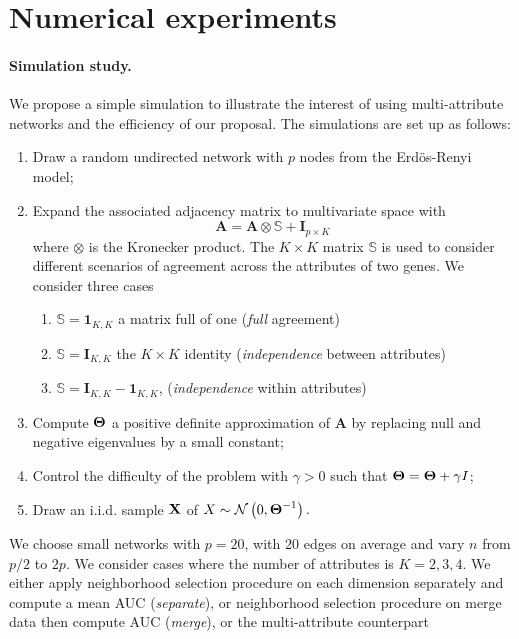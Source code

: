 \section{Numerical  experiments}

\paragraph*{Simulation study.} We propose a simple simulation to
illustrate the interest of using multi-attribute networks and the
efficiency of our proposal.  The simulations are set up as follows:
\begin{enumerate}
\item  Draw  a random  undirected  network  with  $p$ nodes  from  the
  Erdös-Renyi model;
\item  Expand the  associated adjacency  matrix to  multivariate space
  with
  $$\mathbf{A} = \mathbf{A}  \otimes \mathbb{S} + \mathbf{I}_{p\times K}$$
  where $\otimes$ is the Kronecker product. The $K\times K$ matrix
  $\mathbb{S}$ is used to consider different scenarios of agreement
  across the attributes of two genes. We consider three cases
  \begin{enumerate}
  \item $\mathbb{S} = \mathbf{1}_{K,K}$ a matrix full of one (\emph{full} agreement)
  \item $\mathbb{S} = \mathbf{I}_{K,K}$ the $K\times K$ identity (\emph{independence} between  attributes)
  \item $\mathbb{S} = \mathbf{I}_{K,K} - \mathbf{1}_{K,K}$,
    (\emph{independence} within attributes)
  \end{enumerate}
\item Compute $\boldsymbol\Theta$ a positive definite approximation of
  $\mathbf{A}$ by replacing null and negative eigenvalues by a small constant;
\item Control the difficulty of  the problem with $\gamma>0$ such that
  $\boldsymbol\Theta= \boldsymbol\Theta+ \gamma I$;
\item Draw an i.i.d.  sample $\mathbf{X}$ of
  $X \sim \mathcal{N} \left( 0,\boldsymbol\Theta^{-1} \right) .$
\end{enumerate}
We choose small networks with $p=20$, with $20$ edges on average and
vary $n$ from $p/2$ to $2p$. We consider cases where the number of
attributes is $K=2,3,4$.  We either apply neighborhood selection
procedure on each dimension separately and compute a mean AUC
(\emph{separate}), or neighborhood selection procedure on merge data
then compute AUC (\emph{merge}), or the multi-attribute counterpart
